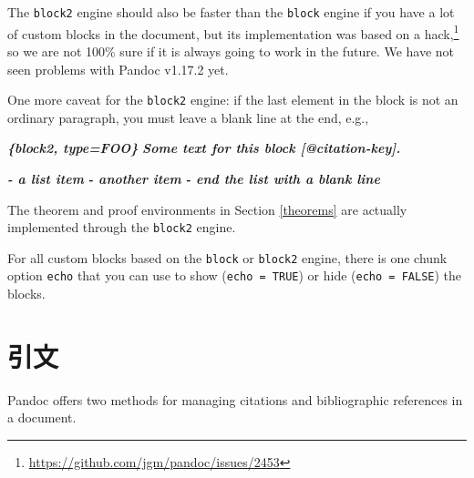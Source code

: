 \documentclass[
  12pt,
]{krantz}
\newenvironment{Shaded}{\begin{snugshade}}{\end{snugshade}}
\newcommand{\InformationTok}[1]{\textcolor[rgb]{0.56,0.35,0.01}{\textbf{\textit{#1}}}}
\renewcommand{\href}[2]{#2\footnote{\url{#1}}}
\theoremstyle{definition}
\theoremstyle{definition}
\theoremstyle{definition}
\theoremstyle{definition}
\theoremstyle{remark}
\begin{document}
The \texttt{block2} engine should also be faster than the \texttt{block} engine if you have a lot of custom blocks in the document, but its implementation was based on \href{https://github.com/jgm/pandoc/issues/2453}{a hack,} so we are not 100\% sure if it is always going to work in the future. We have not seen problems with Pandoc v1.17.2 yet.

One more caveat for the \texttt{block2} engine: if the last element in the block is not an ordinary paragraph, you must leave a blank line at the end, e.g.,

\begin{Shaded}
\begin{Highlighting}[]
\InformationTok{\textasciigrave{}\textasciigrave{}\textasciigrave{}\{block2, type=\textquotesingle{}FOO\textquotesingle{}\}}
\InformationTok{Some text for this block [@citation{-}key].}

\InformationTok{{-} a list item}
\InformationTok{{-} another item}
\InformationTok{{-} end the list with a blank line}

\InformationTok{\textasciigrave{}\textasciigrave{}\textasciigrave{}}
\end{Highlighting}
\end{Shaded}

The theorem and proof environments in Section \ref{theorems} are actually implemented through the \texttt{block2} engine.

For all custom blocks based on the \texttt{block} or \texttt{block2} engine, there is one chunk option \texttt{echo} that you can use to show (\texttt{echo\ =\ TRUE}) or hide (\texttt{echo\ =\ FALSE}) the blocks.

\hypertarget{citations}{%
\section{引文}\label{citations}}

Pandoc offers two methods for managing citations and bibliographic references in a document.
\end{document}
